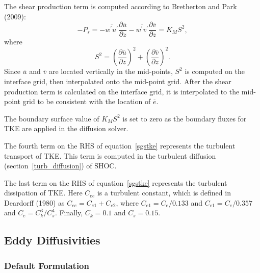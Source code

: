 \documentclass[12pt,titlepage]{article}
\numberwithin{equation}{section}
\begin{document}
The shear production term is computed according to Bretherton and Park (2009):
%
\begin{equation}
  -P_{s}= -\overline{w^{'}u^{'}}\frac{\partial{\overline{u}}}{\partial{z}}-\overline{w^{'}v^{'}}\frac{\partial{\overline{v}}}{\partial{z}} = K_{M}S^{2} , 
  \label{shearprod}
\end{equation}
%
where
\begin{equation}
  S^{2} = \left(\frac{\partial{\overline{u}}}{\partial{z}}\right)^2+\left(\frac{\partial{\overline{v}}}{\partial{z}}\right)^2 . 
  \label{tke_Sterm}
\end{equation}
%
Since $\overline{u}$ and $\overline{v}$ are located vertically in the mid-points, $S^{2}$ is computed on the interface grid, then interpolated onto the mid-point grid.  After the shear production term is calculated on the interface grid, it is interpolated to the mid-point grid to be consistent with the location of $\overline{e}$. 

The boundary surface value of $K_{M}S^{2}$ is set to zero as the boundary fluxes for TKE are applied in the diffusion solver.  

The fourth term on the RHS of equation~\ref{sgstke} represents the turbulent transport of TKE.  This term is computed in the turbulent diffusion (section~\ref{turb_diffusion}) of SHOC.  

The last term on the RHS of equation~\ref{sgstke} represents the turbulent dissipation of TKE.  Here $C_{ee}$ is a turbulent constant, which is defined in Deardorff (1980) as $C_{ee}=C_{e1}+C_{e2}$, where $C_{e1} = C_{e}/0.133$ and $C_{e1} = C_{e}/0.357$ and $C_{e}=C_{k}^{3}/C_{s}^{4}$.  Finally, $C_{k} = 0.1$ and $C_{s} = 0.15$.  

\subsection{Eddy Diffusivities}

\subsubsection{Default Formulation}
\end{document}
